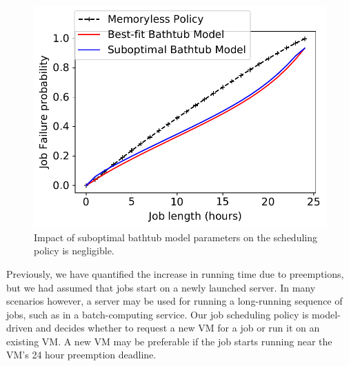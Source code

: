 \begin{figure}
\begin{minipage}[c]{0.3\linewidth}
    \includegraphics[width=\linewidth]{../graphs/wrong-model.pdf}
    \vspace*{-0.8cm}
  \caption{Impact of suboptimal bathtub model parameters on the scheduling policy is negligible.}
  \label{fig:wrong-model}
\end{minipage}
\vspace*{-0.4cm}
\end{figure}


Previously, we have quantified the increase in running time due to preemptions, but we had assumed that jobs start on a newly launched server.
In many scenarios however, a server may be used for running a long-running sequence of jobs, such as in a batch-computing service. 
%
Our job scheduling policy is model-driven and decides whether to request a new VM for a job or run it on an existing VM.
A new VM may be preferable if the job starts running near the VM's 24 hour preemption deadline.

